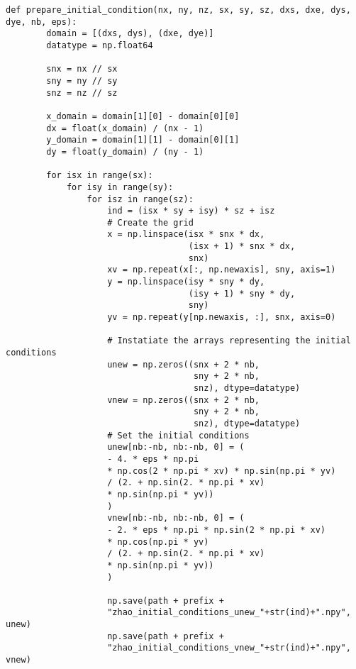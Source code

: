 \begin{lstlisting}[caption={Example code of the domain pre-process function to initialize to fields "unew" and "vnew" into separate files for each subdivision for the Zhao use case.},captionpos=b, label={alg:initfields_per_subdivision}, float, floatplacement=H]
def prepare_initial_condition(nx, ny, nz, sx, sy, sz, dxs, dxe, dys, dye, nb, eps):
        domain = [(dxs, dys), (dxe, dye)]
        datatype = np.float64

        snx = nx // sx
        sny = ny // sy
        snz = nz // sz

        x_domain = domain[1][0] - domain[0][0]
        dx = float(x_domain) / (nx - 1)
        y_domain = domain[1][1] - domain[0][1]
        dy = float(y_domain) / (ny - 1)

        for isx in range(sx):
            for isy in range(sy):
                for isz in range(sz):
                    ind = (isx * sy + isy) * sz + isz
                    # Create the grid
                    x = np.linspace(isx * snx * dx, 
                                    (isx + 1) * snx * dx,
                                    snx)
                    xv = np.repeat(x[:, np.newaxis], sny, axis=1)
                    y = np.linspace(isy * sny * dy,
                                    (isy + 1) * sny * dy,
                                    sny)
                    yv = np.repeat(y[np.newaxis, :], snx, axis=0)

                    # Instatiate the arrays representing the initial conditions
                    unew = np.zeros((snx + 2 * nb,
                                     sny + 2 * nb,
                                     snz), dtype=datatype)
                    vnew = np.zeros((snx + 2 * nb, 
                                     sny + 2 * nb,
                                     snz), dtype=datatype)
                    # Set the initial conditions
                    unew[nb:-nb, nb:-nb, 0] = (
                    - 4. * eps * np.pi 
                    * np.cos(2 * np.pi * xv) * np.sin(np.pi * yv)
                    / (2. + np.sin(2. * np.pi * xv)
                    * np.sin(np.pi * yv))
                    )
                    vnew[nb:-nb, nb:-nb, 0] = (
                    - 2. * eps * np.pi * np.sin(2 * np.pi * xv)
                    * np.cos(np.pi * yv)
                    / (2. + np.sin(2. * np.pi * xv)
                    * np.sin(np.pi * yv))
                    )

                    np.save(path + prefix + 
                    "zhao_initial_conditions_unew_"+str(ind)+".npy", unew)
                    np.save(path + prefix +
                    "zhao_initial_conditions_vnew_"+str(ind)+".npy", vnew)
\end{lstlisting}

